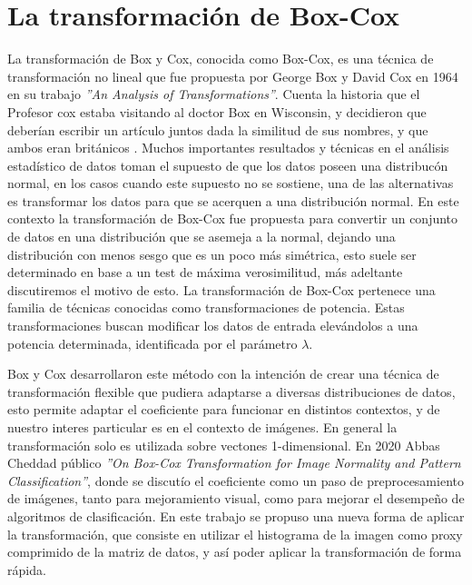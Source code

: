 \chapter{La transformaci\'on de Box-Cox}\label{chap4}

    La transformaci\'on de Box y Cox, conocida como Box-Cox, es una t\'ecnica de transformaci\'on no lineal que fue propuesta por George Box y David Cox en 1964 en su trabajo \textit{''An Analysis of Transformations''}\cite{boxcox64}. Cuenta la historia que el Profesor cox estaba visitando al doctor Box en Wisconsin, y decidieron que deberían escribir un artículo juntos dada la similitud de sus nombres, y que ambos eran británicos \cite{lane2003introduction}. 
    Muchos importantes resultados y t\'ecnicas en el an\'alisis estad\'istico de datos toman el supuesto de que los datos poseen una distribuc\'on normal, en los casos cuando este supuesto no se sostiene, una de las alternativas es transformar los datos para que se acerquen a una distribuci\'on normal. En este contexto la transformaci\'on de Box-Cox fue propuesta para convertir un conjunto de datos en una distribuci\'on que se asemeja a la normal, dejando una distribuci\'on con menos sesgo que es un poco m\'as sim\'etrica, esto suele ser determinado en base a un test de m\'axima verosimilitud, m\'as adeltante discutiremos el motivo de esto. La transformaci\'on de Box-Cox pertenece una familia de t\'ecnicas conocidas como transformaciones de potencia. Estas transformaciones buscan modificar los datos de entrada elev\'andolos a una potencia determinada, identificada por el par\'ametro $\lambda$.
    
    Box y Cox desarrollaron este m\'etodo con la intenci\'on de crear una t\'ecnica de transformaci\'on flexible que pudiera adaptarse a diversas distribuciones de datos, esto permite adaptar el coeficiente para funcionar en distintos contextos, y de nuestro interes particular es en el contexto de im\'agenes. En general la transformaci\'on solo es utilizada sobre vectones 1-dimensional. En 2020 Abbas Cheddad p\'ublico \textit{''On Box-Cox Transformation for Image Normality and Pattern Classification''}\cite{boxcoximg}, donde se discut\'io el coeficiente como un paso de preprocesamiento de im\'agenes, tanto para mejoramiento visual, como para mejorar el desempe\~no de algoritmos de clasificaci\'on. En este trabajo se propuso una nueva forma de aplicar la transformaci\'on, que consiste en utilizar el histograma de la imagen como proxy comprimido de la matriz de datos, y as\'i poder aplicar la transformaci\'on de forma r\'apida.
    
